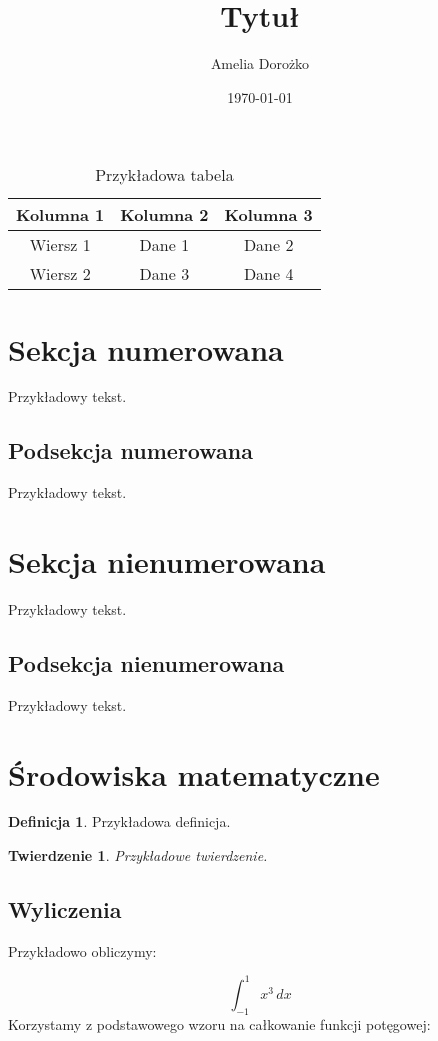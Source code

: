 \documentclass{article}
\title{Tytuł}
\author{Amelia Dorożko}
\date{\today}
\newtheorem{theorem}{Twierdzenie}
\theoremstyle{definition}
\newtheorem{definition}{Definicja}
\begin{document}
	
	\maketitle
	\begin{table}
		\centering
		\begin{tabular}{|c|c|c|}
			\hline
			Kolumna 1 & Kolumna 2 & Kolumna 3 \\ \hline
			Wiersz 1  & Dane 1    & Dane 2    \\ \hline
			Wiersz 2  & Dane 3    & Dane 4    \\ \hline
		\end{tabular}
		\caption{Przykładowa tabela}
	
	\end{table}
	\section{Sekcja numerowana}
	Przykładowy tekst.
	\subsection{Podsekcja numerowana}
	Przykładowy tekst.
	\section*{Sekcja nienumerowana}
	Przykładowy tekst.
	\subsection*{Podsekcja nienumerowana}
	Przykładowy tekst.
	\section{Środowiska matematyczne}
	\begin{definition}
		Przykładowa definicja.
	\end{definition}
	\begin{theorem}
		Przykładowe twierdzenie.
	\end{theorem}
	

	
	\subsection*{Wyliczenia}
	
	Przykładowo obliczymy:
	
	\[
	\int_{-1}^{1} x^3 \, dx
	\]
	Korzystamy z podstawowego wzoru na całkowanie funkcji potęgowej:
	
\end{document}
